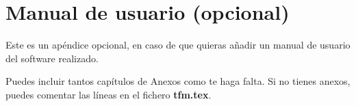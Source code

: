 \chapter{Manual de usuario (opcional)}

Este es un apéndice opcional, en caso de que quieras añadir un manual de usuario del software realizado.

Puedes incluir tantos capítulos de Anexos como te haga falta. Si no tienes anexos, puedes comentar las líneas en el fichero \textbf{tfm.tex}.

